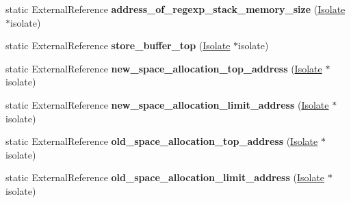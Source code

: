 \begin{DoxyCompactItemize}
\item 
static External\+Reference {\bfseries address\+\_\+of\+\_\+regexp\+\_\+stack\+\_\+memory\+\_\+size} (\hyperlink{classv8_1_1internal_1_1_isolate}{Isolate} $\ast$isolate)\hypertarget{classv8_1_1internal_1_1_b_a_s_e___e_m_b_e_d_d_e_d_a203999c3ac07e390d5f793daf81e24eb}{}\label{classv8_1_1internal_1_1_b_a_s_e___e_m_b_e_d_d_e_d_a203999c3ac07e390d5f793daf81e24eb}

\item 
static External\+Reference {\bfseries store\+\_\+buffer\+\_\+top} (\hyperlink{classv8_1_1internal_1_1_isolate}{Isolate} $\ast$isolate)\hypertarget{classv8_1_1internal_1_1_b_a_s_e___e_m_b_e_d_d_e_d_a588afcb6e59dc414dd326b30300b097b}{}\label{classv8_1_1internal_1_1_b_a_s_e___e_m_b_e_d_d_e_d_a588afcb6e59dc414dd326b30300b097b}

\item 
static External\+Reference {\bfseries new\+\_\+space\+\_\+allocation\+\_\+top\+\_\+address} (\hyperlink{classv8_1_1internal_1_1_isolate}{Isolate} $\ast$isolate)\hypertarget{classv8_1_1internal_1_1_b_a_s_e___e_m_b_e_d_d_e_d_a47ec0e2e49e6f7b6c699c189a953177e}{}\label{classv8_1_1internal_1_1_b_a_s_e___e_m_b_e_d_d_e_d_a47ec0e2e49e6f7b6c699c189a953177e}

\item 
static External\+Reference {\bfseries new\+\_\+space\+\_\+allocation\+\_\+limit\+\_\+address} (\hyperlink{classv8_1_1internal_1_1_isolate}{Isolate} $\ast$isolate)\hypertarget{classv8_1_1internal_1_1_b_a_s_e___e_m_b_e_d_d_e_d_a811027c17bd67cf6ac0265a5107f8af8}{}\label{classv8_1_1internal_1_1_b_a_s_e___e_m_b_e_d_d_e_d_a811027c17bd67cf6ac0265a5107f8af8}

\item 
static External\+Reference {\bfseries old\+\_\+space\+\_\+allocation\+\_\+top\+\_\+address} (\hyperlink{classv8_1_1internal_1_1_isolate}{Isolate} $\ast$isolate)\hypertarget{classv8_1_1internal_1_1_b_a_s_e___e_m_b_e_d_d_e_d_adf2ddd755e155e067fd11d9232c3b293}{}\label{classv8_1_1internal_1_1_b_a_s_e___e_m_b_e_d_d_e_d_adf2ddd755e155e067fd11d9232c3b293}

\item 
static External\+Reference {\bfseries old\+\_\+space\+\_\+allocation\+\_\+limit\+\_\+address} (\hyperlink{classv8_1_1internal_1_1_isolate}{Isolate} $\ast$isolate)\hypertarget{classv8_1_1internal_1_1_b_a_s_e___e_m_b_e_d_d_e_d_a404bb966cad11bf8cd1a2980bd70c67b}{}\label{classv8_1_1internal_1_1_b_a_s_e___e_m_b_e_d_d_e_d_a404bb966cad11bf8cd1a2980bd70c67b}


\end{DoxyCompactItemize}
